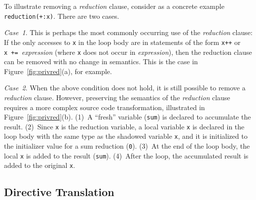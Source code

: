 \documentclass{sig-alternate-05-2015}
\begin{document}
To illustrate removing a \emph{reduction} clause, consider as a concrete example
\texttt{reduction(+:x)}.  There are two cases.

\textit{Case~1}.  This is perhaps the most commonly occurring use of the
\emph{reduction} clause: If the only accesses to \texttt{x} in the loop
body are in statements of the form \texttt{x++} or \texttt{x\ +=\
}\emph{expression} (where \texttt{x} does not occur in \emph{expression}),
then the reduction clause can be removed with no change in semantics.  This is
the case in Figure~\ref{fig:privred}(a), for example.

\textit{Case~2}.  When the above condition does not hold, it is still possible
to remove a \emph{reduction} clause.  However, preserving the semantics of the
\emph{reduction} clause requires a more complex source code transformation,
illustrated in Figure~\ref{fig:privred}(b).
(1)~A ``fresh'' variable (\texttt{sum}) is declared to accumulate the result.
(2)~Since \texttt{x} is the reduction variable, a local variable \texttt{x}
is declared in the loop body with the same type as the shadowed variable
\texttt{x}, and it is initialized to the initializer value for a sum
reduction (\texttt{0}).
(3)~At the end of the loop body, the local \texttt{x} is added to the result
(\texttt{sum}).
(4)~After the loop, the accumulated result is added to the original
\texttt{x}.

\subsection{Directive Translation}
\label{sec:directives}
\end{document}
